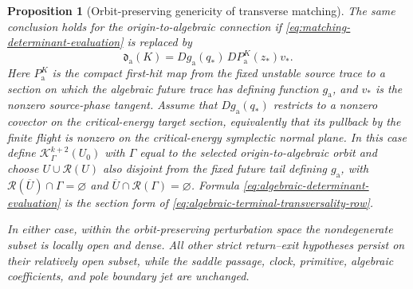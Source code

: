 \documentclass[11pt]{amsart}
\numberwithin{equation}{section}
\newtheorem{proposition}[theorem]{Proposition}
\theoremstyle{definition}
\theoremstyle{remark}
\begin{document}
\begin{proposition}[Orbit-preserving genericity of transverse matching]
The same conclusion holds for the origin-to-algebraic connection if
\eqref{eq:matching-determinant-evaluation} is replaced by
\begin{equation}\label{eq:algebraic-determinant-evaluation}
 \mathfrak d_{\mathrm a}(K)
 =Dg_{\mathrm a}(q_*)\,DP_{\mathrm a}^{K}(z_*)v_*.
\end{equation}
Here $P_{\mathrm a}^{K}$ is the compact first-hit map from the fixed
unstable source trace to a section on which the algebraic future trace has
defining function $g_{\mathrm a}$, and $v_*$ is the nonzero source-phase
tangent.  Assume that $Dg_{\mathrm a}(q_*)$ restricts to a nonzero covector
on the critical-energy target section, equivalently that its pullback by
the finite flight is nonzero on the critical-energy symplectic normal
plane.  In this case define
$\mathcal K_\Gamma^{k+2}(U_0)$ with $\Gamma$ equal to the selected
origin-to-algebraic orbit and choose
$U\cup\mathcal R(U)$ also disjoint from the fixed future tail defining
$g_{\mathrm a}$, with
$\mathcal R(\overline U)\cap\Gamma=\varnothing$ and
$\overline U\cap\mathcal R(\Gamma)=\varnothing$.  Formula
\eqref{eq:algebraic-determinant-evaluation} is the section form of
\eqref{eq:algebraic-terminal-transversality-row}.

In either case, within the orbit-preserving perturbation space the
nondegenerate subset is locally open and dense.  All other strict
return--exit hypotheses persist on their relatively open subset, while
the saddle passage, clock, primitive, algebraic coefficients, and pole
boundary jet are unchanged.
\end{proposition}
\end{document}
